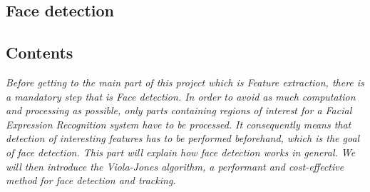   \begin{titlepage}
    \vspace*{\fill}
      \part{Face detection}
    \vspace*{\fill}
  \end{titlepage}
  
\startcontents[parts]

\chapter*{Contents}

\textit{Before getting to the main part of this project which is Feature extraction, there is a mandatory step that is Face detection. In order to avoid as much computation and processing as possible, only parts containing regions of interest for a Facial Expression Recognition system have to be processed. It consequently means that detection of interesting features has to be performed beforehand, which is the goal of face detection. This part will explain how face detection works in general. We will then introduce the Viola-Jones algorithm, a performant and cost-effective method for face detection and tracking.}

\vspace{\baselineskip}


\pagebreak


\newpage


\stopcontents[parts]

